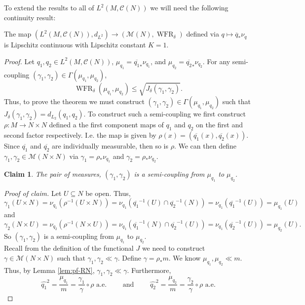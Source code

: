 \documentclass[final,hidelinks,onefignum,onetabnum]{siamart220329}
\newtheorem{claim}{Claim}
\newcommand{\WFR}{\operatorname{WFR}}
\begin{document}
To extend the results to all of $L^2(M,\mathcal{C}(N))$ we will need  the following continuity result:
\begin{lemma}\label{lem:continuity_cone}
The map $(L^2(M,\mathcal{C}(N)),d_{L^2})\to (\mathcal{M}(N),   \WFR_\delta)$ defined via $q\mapsto \overline{q}_*\nu_q$ is Lipschitz continuous with Lipschitz constant $K=1$.
\end{lemma}
\begin{proof}Let $q_1,q_2\in L^2(M,\mathcal{C}(N))$, $\mu_{q_1}= \overline{q_1}_*\nu_{q_1}$, and $\mu_{q_2}= \overline{q_2}_*\nu_{q_2}$. For any semi-coupling $(\gamma_1,\gamma_2)\in\Gamma(\mu_{q_1},\mu_{q_2})$,\[\WFR_\delta(\mu_{q_1},\mu_{q_2})\leq \sqrt{J_\delta(\gamma_1,\gamma_2)}.\]
Thus, to prove the theorem we must construct $(\gamma_1,\gamma_2)\in \Gamma(\mu_{q_1},\mu_{q_2})$ such that $J_\delta(\gamma_1,\gamma_2)=d_{L_2}(q_1,q_2)$. To construct such a semi-coupling  we first construct $\rho:M\to N\times N$ defined a the first component maps of ${q_1}$ and ${q_2}$ on the first and second factor respectively. I.e. the map is given by $\rho(x)=\left(\overline{q_1}(x),\overline{q_2}(x)\right).$
Since $\overline{q_1}$ and $\overline{q_2}$ are individually measurable, then so is $\rho$. We can then define $\gamma_1,\gamma_2\in\mathcal{M}(N\times N)$ via $\gamma_1=\rho_*\nu_{q_1}$ and $\gamma_2=\rho_*\nu_{q_2}$. 
\begin{claim}
The pair of measures, $(\gamma_1,\gamma_2)$ is a semi-coupling from $\mu_{q_1}$ to $\mu_{q_2}$.
\end{claim}
\noindent\textit{Proof of claim. } Let $U\subseteq N$ be open. Thus,
\[\gamma_1(U\times N)= \nu_{q_1}\left(\rho^{-1}(U\times N)\right)= \nu_{q_1}\left(\overline{{q_1}}^{-1}(U)\cap \overline{q_2}^{-1}(N)\right)=\nu_{q_1}\left(\overline{{q_1}}^{-1}(U)\right)=\mu_{q_1}(U) \]
and
\[\gamma_2(N\times U)= \nu_{q_2}\left(\rho^{-1}(N\times U)\right)= \nu_{q_1}\left(\overline{{q_1}}^{-1}(N)\cap \overline{q_2}^{-1}(U)\right)=\nu_{q_1}\left(\overline{q_2}^{-1}(U)\right)=\mu_{q_2}(U).\]
So $(\gamma_1,\gamma_2)$ is a semi-coupling from $\mu_{q_1}$ to $\mu_{q_2}$.
\bigskip\\
Recall from the definition of the functional $J$ we need to construct $\gamma\in\mathcal{M}(N\times N  )$ such that $\gamma_1,\gamma_2\ll\gamma$. Define $\gamma= \rho_*m$. We know $\mu_{q_1},\mu_{q_2}\ll m$. Thus, by Lemma \ref{lem:pf-RN}, $\gamma_1,\gamma_2\ll\gamma$. Furthermore,\[\hat{q_1}^2=\frac{\mu_{q_1}}{m}=\frac{\gamma_1}{\gamma}\circ \rho\text{ a.e.}\qquad\text{ and }\qquad\hat{q_2}^2=\frac{\mu_{q_2}}{m}=\frac{\gamma_2}{\gamma}\circ \rho \text{ a.e.}\]

\end{proof}
\end{document}
